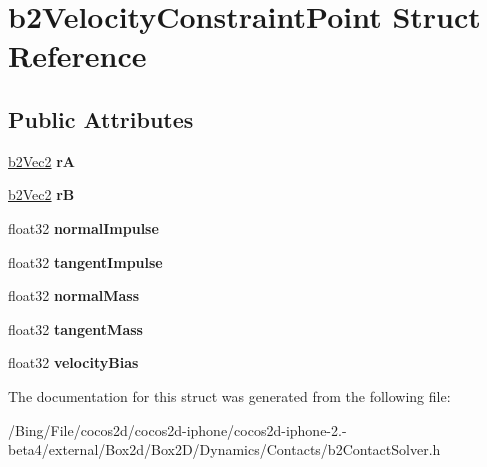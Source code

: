 \hypertarget{structb2_velocity_constraint_point}{\section{b2\-Velocity\-Constraint\-Point Struct Reference}
\label{structb2_velocity_constraint_point}
}
\subsection*{Public Attributes}
\begin{DoxyCompactItemize}
\item 
\hypertarget{structb2_velocity_constraint_point_a0be704259cd5d3902d8581e186546e5e}{\hyperlink{structb2_vec2}{b2\-Vec2} {\bfseries r\-A}}\label{structb2_velocity_constraint_point_a0be704259cd5d3902d8581e186546e5e}

\item 
\hypertarget{structb2_velocity_constraint_point_ab5d1c98e09e2f859b71f6d0fda46c0d5}{\hyperlink{structb2_vec2}{b2\-Vec2} {\bfseries r\-B}}\label{structb2_velocity_constraint_point_ab5d1c98e09e2f859b71f6d0fda46c0d5}

\item 
\hypertarget{structb2_velocity_constraint_point_a304653be2ca1c1daa72d7b7868b37b11}{float32 {\bfseries normal\-Impulse}}\label{structb2_velocity_constraint_point_a304653be2ca1c1daa72d7b7868b37b11}

\item 
\hypertarget{structb2_velocity_constraint_point_ac3e3be335d204bb6a89a7303831cc89b}{float32 {\bfseries tangent\-Impulse}}\label{structb2_velocity_constraint_point_ac3e3be335d204bb6a89a7303831cc89b}

\item 
\hypertarget{structb2_velocity_constraint_point_a5997e9781cedbd86333a84a967b59c33}{float32 {\bfseries normal\-Mass}}\label{structb2_velocity_constraint_point_a5997e9781cedbd86333a84a967b59c33}

\item 
\hypertarget{structb2_velocity_constraint_point_a029692226a637f5e687022041b25043c}{float32 {\bfseries tangent\-Mass}}\label{structb2_velocity_constraint_point_a029692226a637f5e687022041b25043c}

\item 
\hypertarget{structb2_velocity_constraint_point_a81d492345d9b1c8f51ec10154ab840f2}{float32 {\bfseries velocity\-Bias}}\label{structb2_velocity_constraint_point_a81d492345d9b1c8f51ec10154ab840f2}

\end{DoxyCompactItemize}


The documentation for this struct was generated from the following file\-:\begin{DoxyCompactItemize}
\item 
/\-Bing/\-File/cocos2d/cocos2d-\/iphone/cocos2d-\/iphone-\/2.-\/beta4/external/\-Box2d/\-Box2\-D/\-Dynamics/\-Contacts/b2\-Contact\-Solver.\-h\end{DoxyCompactItemize}
